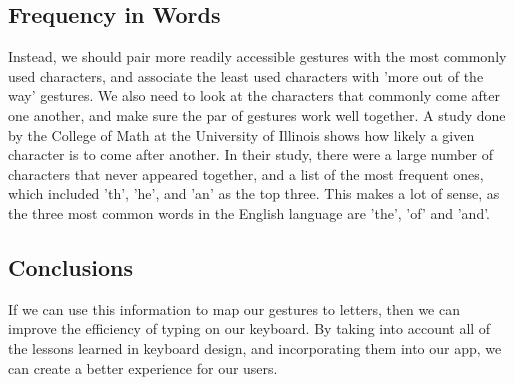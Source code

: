\documentclass[onecolumn, draftclsnofoot,10pt, journal, letterpaper]{IEEEtran}
\begin{document}
    \subsection{Frequency in Words}
    Instead, we should pair more readily accessible gestures with the most commonly used characters, and associate the least used characters with 'more out of the way' gestures. We also need to look at the characters that commonly come after one another, and make sure the par of gestures work well together. A study done by the College of Math at the University of Illinois shows how likely a given character is to come after another. In their study, there were a large number of characters that never appeared together, and a list of the most frequent ones, which included 'th', 'he', and 'an' as the top three. \cite{jeffrey_s._leon_frequency_2008} This makes a lot of sense, as the three most common words in the English language are 'the', 'of' and 'and'. \cite{noauthor_100_2019}\par
    \subsection{Conclusions}
    If we can use this information to map our gestures to letters, then we can improve the efficiency of typing on our keyboard. By taking into account all of the lessons learned in keyboard design, and incorporating them into our app, we can create a better experience for our users.
\newpage


\end{document}
